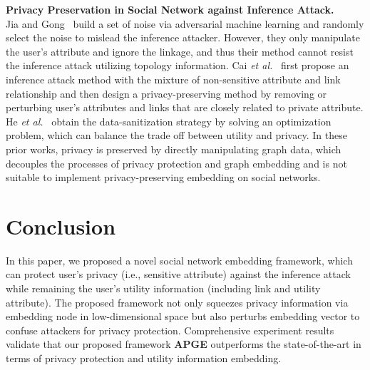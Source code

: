 \documentclass{article}
\begin{document}
\textbf{Privacy Preservation in Social Network against Inference Attack.}\\
Jia and Gong~\citep{jia2018attriguard} build a set of noise via adversarial machine learning and randomly select the noise to mislead the inference attacker. However, they only manipulate the user's attribute and ignore the linkage, and thus their method cannot resist the inference attack utilizing topology information. 
Cai {\em et al.}~\citep{cai2018collective} first propose an inference attack method with the mixture of non-sensitive attribute and link relationship and then design a privacy-preserving method by removing or perturbing user's attributes and links that are closely related to private attribute. He {\em et al.}~\citep{he2018latent} obtain the data-sanitization strategy by solving an optimization problem, which can balance the trade off between utility and privacy. 
In these prior works, privacy is preserved by directly manipulating graph data, which decouples the processes of privacy protection and graph embedding and is not suitable to implement privacy-preserving embedding on social networks.



\section{Conclusion}
In this paper, we proposed a novel social network embedding framework, which can protect user's privacy (i.e., sensitive attribute) against the inference attack while remaining the user's utility information (including link and utility attribute). The proposed framework not only squeezes privacy information via embedding node in low-dimensional space but also perturbs embedding vector to confuse attackers for privacy protection. Comprehensive experiment results validate that our proposed framework \textbf{APGE} outperforms the state-of-the-art in terms of privacy protection and utility information embedding.



\end{document}
